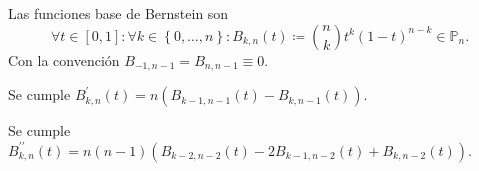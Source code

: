 \begin{frame}
    \begin{definition}
        Las funciones base de Bernstein son
        \begin{equation*}
            \forall t\in\left[0,1\right]:
            \forall k\in\left\{0,\dotsc,n\right\}:
            B_{k,n}\left(t\right)\coloneqq
            \binom{n}{k}
            t^{k}
            \left(1-t\right)^{n-k}\in\mathbb{P}_{n}.
        \end{equation*}
        Con la convención
        \begin{math}
            B_{-1,n-1}=
            B_{n,n-1}\equiv0
        \end{math}.
    \end{definition}

    \begin{theorem}
        Se cumple
        \begin{math}
            B^{\prime}_{k,n}\left(t\right)=
            n
            \left(
            B_{k-1,n-1}\left(t\right)-
            B_{k,n-1}\left(t\right)
            \right)
        \end{math}.
    \end{theorem}

    \begin{corollary}
        Se cumple
        \begin{math}
            B^{\prime\prime}_{k,n}\left(t\right)=
            n\left(n-1\right)
            \left(
            B_{k-2,n-2}\left(t\right)-
            2B_{k-1,n-2}\left(t\right)+
            B_{k,n-2}\left(t\right)
            \right)
        \end{math}.
    \end{corollary}


\end{frame}
